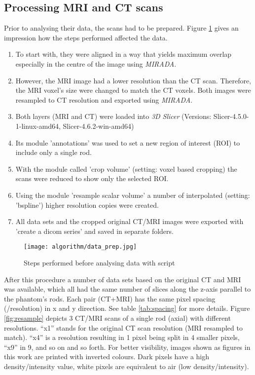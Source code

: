 \subsection{Processing MRI and CT scans}

Prior to analysing their data, the scans had to be prepared.
Figure \ref{fig:data_prep} gives an impression how the steps performed affected the data.

\begin{enumerate}[label=\textbf{Step \arabic*}]
\item To start with, they were aligned in a way that yields maximum overlap especially in the centre of the image using \textit{MIRADA}.
\item However, the MRI image had a lower resolution than the CT scan.
Therefore, the MRI voxel's size were changed to match the CT voxels. Both images were resampled to CT resolution and exported using \textit{MIRADA}.
\item Both layers (MRI and CT) were loaded into \textit{3D Slicer} (Versions: Slicer-4.5.0-1-linux-amd64, Slicer-4.6.2-win-amd64)
\item Its module 'annotations' was used to set a new region of interest (ROI) to include only a single rod.
\item With the module called 'crop volume' (setting: voxel based cropping) the scans were reduced to show only the selected ROI.
\item Using the module 'resample scalar volume' a number of interpolated (setting: 'bspline') higher resolution copies were created.
\item All data sets and the cropped original CT/MRI images were exported with 'create a dicom series' and saved in separate folders.
\end{enumerate}

\begin{figure}[!tbp]
\centering
\texttt{[image: algorithm/data\_prep.jpg]}
\caption{Steps performed before analysing data with script}
\label{fig:data_prep}
\end{figure}

After this procedure a number of data sets based on the original CT and MRI was available, which all had the same number of slices along the z-axis parallel to the phantom's rods.
Each pair (CT+MRI) has the same pixel spacing (/resolution) in x and y direction.
See table \ref{tab:spacing} for more details.
Figure \ref{fig:resample} depicts 3 CT/MRI scans of a single rod (axial) with different resolutions.
``x1'' stands for the original CT scan resolution (MRI resampled to match).
``x4'' is a resolution resulting in 1 pixel being split in 4 smaller pixels, ``x9'' in 9, and so on and so forth.
For better visibility, images shown as figures in this work are printed with inverted colours.
Dark pixels have a high density/intensity value, white pixels are equivalent to air (low density/intensity).

